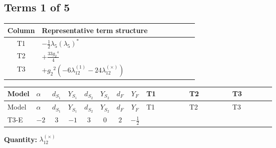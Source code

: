 \documentclass[8pt]{article}
\begin{document}
\begin{landscape}
\subsection*{Terms 1 of 5}
\begin{center}
\begin{tabular}{@{}c >{\raggedright\arraybackslash}p{0.82\linewidth}@{}}
\toprule
Column & Representative term structure \\
\midrule
T1 & \(\displaystyle -\frac{1}{2} {\lambda_5} \left({\lambda_5}\right)^{*}\) \\
\midrule
T2 & \(\displaystyle +\frac{33 {g_2}^4}{4}\) \\
\midrule
T3 & \(\displaystyle +{g_2}^2 (-6 {\lambda_{12}^{(1)}}-24 {\lambda_{12}^{(\times)}})\) \\
\midrule
\bottomrule
\end{tabular}
\end{center}
\smallskip
\tiny
\begin{longtable}{@{}llcccccc >{\raggedright\arraybackslash}p{0.21\linewidth} >{\raggedright\arraybackslash}p{0.21\linewidth} >{\raggedright\arraybackslash}p{0.21\linewidth}@{}}
\toprule
Model & $\alpha$ & $d_{S_1}$ & $Y_{S_1}$ & $d_{S_2}$ & $Y_{S_2}$ & $d_F$ & $Y_F$ & T1 & T2 & T3 \\
\midrule
\endfirsthead
\toprule
Model & $\alpha$ & $d_{S_1}$ & $Y_{S_1}$ & $d_{S_2}$ & $Y_{S_2}$ & $d_F$ & $Y_F$ & T1 & T2 & T3 \\
\midrule
\endhead
T3-E & $-2$ & $3$ & $-1$ & $3$ & $0$ & $2$ & $-\frac{1}{2}$ & \scriptsize\adjustbox{max width=\linewidth}{$\begin{gathered} -\frac{1}{2} {\lambda_5} \left({\lambda_5}\right)^{*}\end{gathered}$} & \scriptsize\adjustbox{max width=\linewidth}{$\begin{gathered} +\frac{33 {g_2}^4}{4}\end{gathered}$} & \scriptsize\adjustbox{max width=\linewidth}{$\begin{gathered} +{g_2}^2 (-6 {\lambda_{12}^{(1)}}-24 {\lambda_{12}^{(\times)}})\end{gathered}$} \\
\midrule
\bottomrule
\end{longtable}
\clearpage
\noindent\textbf{Quantity: }$\lambda_{12}^{(\times)}$\par\smallskip

\end{landscape}
\end{document}
